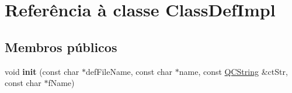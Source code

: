 \hypertarget{class_class_def_impl}{\section{Referência à classe Class\-Def\-Impl}
\label{class_class_def_impl}
}
\subsection*{Membros públicos}
\begin{DoxyCompactItemize}
\item 
\hypertarget{class_class_def_impl_a5816ee2b1949bd5bf9ef84702448795c}{void {\bfseries init} (const char $\ast$def\-File\-Name, const char $\ast$name, const \hyperlink{class_q_c_string}{Q\-C\-String} \&ct\-Str, const char $\ast$f\-Name)}\label{class_class_def_impl_a5816ee2b1949bd5bf9ef84702448795c}

\end{DoxyCompactItemize}
